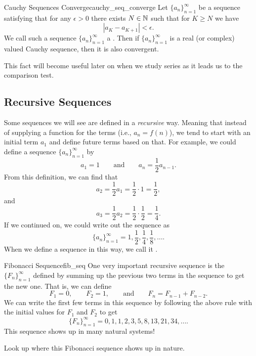 \begin{thm}{Cauchy Sequences Converge}{cauchy_seq_converge}
Let $\{a_n\}_{n=1}^\infty$ be a sequence satisfying that for any $\epsilon >0$ there exists $N\in \mathbb{N}$ such that for $K\geq N$ we have
\[
|a_{K}-a_{K+1}|<\epsilon.
\]
We call such a sequence $\{a_n\}_{n=1}^\infty$ a .  Then if $\{a_n\}_{n=1}^\infty$ is a real (or complex) valued Cauchy sequence, then it is also convergent.
\end{thm}

\noindent This fact will become useful later on when we study series as it leads us to the comparison test.

\subsection{Recursive Sequences}

Some sequences we will see are defined in a \emph{recursive} way.  Meaning that instead of supplying a function for the terms (i.e., $a_n = f(n)$), we tend to start with an initial term $a_1$ and define future terms based on that.  For example, we could define a sequence $\{a_n\}_{n=1}^\infty$ by
\[
a_1 = 1 \qquad \textrm{and} \qquad a_n = \frac{1}{2} a_{n-1}.
\]
From this definition, we can find that
\[
a_2 = \frac{1}{2} a_1 = \frac{1}{2} \cdot 1 = \frac{1}{2},
\]
and
\[
a_3 = \frac{1}{2} a_2 = \frac{1}{2} \cdot \frac{1}{2} = \frac{1}{4}.
\]
If we continued on, we could write out the sequence as
\[
\{a_n\}_{n=1}^\infty = 1, \frac{1}{2},\frac{1}{4}, \frac{1}{8}, \dots.
\]
When we define a sequence in this way, we call it .

\begin{ex}{Fibonacci Sequence}{fib_seq}
One very important recursive sequence is the  $\{F_n\}_{n=1}^\infty$ defined by summing up the previous two terms in the sequence to get the new one.  That is, we can define
\[
F_1 = 0, \qquad F_2=1, \qquad \textrm{and} \qquad F_n = F_{n-1} + F_{n-2}.
\]
We can write the first few terms in this sequence by following the above rule with the initial values for $F_1$ and $F_2$ to get
\[
\{F_n\}_{n=1}^\infty = 0,1,1,2,3,5,8,13,21,34,\dots.
\]
This sequence shows up in many natural systems!
\end{ex}

\begin{exercise}
Look up where this Fibonacci sequence shows up in nature.
\end{exercise}

